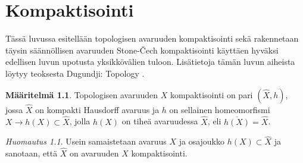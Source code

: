 \documentclass[12pt,a4paper,leqno]{report}
\theoremstyle{plain}
\theoremstyle{definition}
\newtheorem{maar}[equation]{Määritelmä}
\theoremstyle{remark}
\newtheorem{huom}[equation]{Huomautus}
\begin{document}
\chapter{Kompaktisointi}
Tässä luvussa esitellään topologisen avaruuden kompaktisointi sekä rakennetaan täysin säännöllisen avaruuden Stone-Čech kompaktisointi käyttäen hyväksi edellisen luvun upotusta yksikkövälien tuloon.
Lisätietoja tämän luvun aiheista löytyy teoksesta Dugundji: Topology \cite{Dugu}.

\begin{maar}
Topologisen avaruuden $X$ kompaktisointi on pari $(\hat{X},h)$, 
jossa $\hat{X}$ on kompakti Hausdorff avaruus 
ja $h$ on sellainen homeomorfismi $X\rightarrow h(X)\subset\hat{X}$, 
jolla $h(X)$ on tiheä avaruudessa $\hat{X}$, eli $\overline{ h(X)}=\hat{X}$. 
\end{maar}
\begin{huom}
Usein samaistetaan avaruus $X$ ja osajoukko $h(X)\subset\hat{X}$ ja sanotaan, 
että $\hat{X}$ on avaruuden $X$ kompaktisointi. 
\end{huom}
\end{document}
